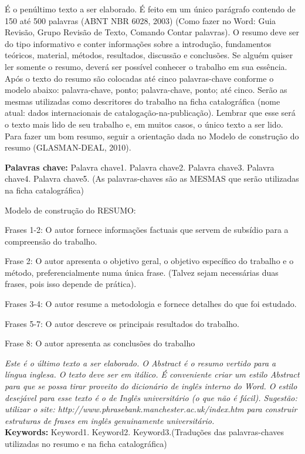 
\setlength{\absparsep}{18pt} %
\begin{resumo}
 É o penúltimo texto a ser elaborado. É feito em um único parágrafo contendo de 150 até 500 palavras (ABNT NBR 6028, 2003) (Como fazer no Word: Guia Revisão, Grupo Revisão de Texto, Comando Contar palavras). O resumo deve ser do tipo informativo e conter informações sobre a introdução, fundamentos teóricos, material, métodos, resultados, discussão e conclusões. Se alguém quiser ler somente o resumo, deverá ser possível conhecer o trabalho em sua essência. Após o texto do resumo são colocadas até cinco palavras-chave conforme o modelo abaixo: palavra-chave, ponto; palavra-chave, ponto; até cinco. Serão as mesmas utilizadas como descritores do trabalho na ficha catalográfica (nome atual: dados internacionais de catalogação-na-publicação). Lembrar que esse será o texto mais lido de seu trabalho e, em muitos casos, o único texto a ser lido. Para fazer um bom resumo, seguir a orientação dada no Modelo de construção do resumo (GLASMAN-DEAL, 2010).
 
\textbf{Palavras chave:} Palavra chave1. Palavra chave2. Palavra chave3. Palavra chave4. Palavra chave5. (As palavras-chaves são as MESMAS que serão utilizadas na ficha catalográfica)

Modelo de construção do RESUMO:

Frases 1-2: O autor fornece informações factuais que servem de subsídio para a compreensão do trabalho.

Frase 2: O autor apresenta o objetivo geral, o objetivo específico do trabalho e o método, preferencialmente numa única frase. (Talvez sejam necessárias duas frases, pois isso depende de prática).

Frases 3-4: O autor resume a metodologia e fornece detalhes do que foi estudado.

Frases 5-7: O autor descreve os principais resultados do trabalho.

Frase 8: O autor apresenta as conclusões do trabalho 

\end{resumo}

\begin{resumo}[Abstract]
    \foreignlanguage{english}
    {
        \textit{
        Este é o último texto a ser elaborado. O Abstract é o resumo vertido para a língua inglesa. O texto deve ser em itálico. É conveniente criar um estilo Abstract para que se possa tirar proveito do dicionário de inglês interno do Word. O estilo desejável para esse texto é o de Inglês universitário (o que não é fácil). Sugestão: utilizar o site: http://www.phrasebank.manchester.ac.uk/index.htm para construir estruturas de frases em inglês genuinamente universitário.
        }
    }
    \vspace{\onelineskip}
    \noindent 
    \textbf{\\Keywords:} Keyword1. Keyword2. Keyword3.(Traduções das palavras-chaves utilizadas no resumo e na ficha catalográfica)

\end{resumo}